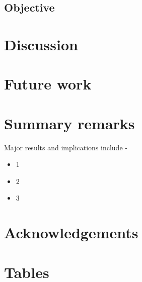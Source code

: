 \documentclass[11pt,a4paper]{article}
\makeatletter
\renewcommand\listoftables{%
    \@starttoc{lot}%
}
\makeatother
\begin{document}
\subsection{Objective} \label{sec-obj}


\newpage


\section{Discussion} \label{sec-disc}


\newpage


\section{Future work} \label{sec-fwk}


\newpage


\section{Summary remarks} \label{sec-sum}

Major results and implications include - 
\begin{itemize}[topsep=0pt,itemsep=-0.75ex,partopsep=1ex,parsep=1ex,leftmargin=*]
    \item 1
    \item 2
    \item 3
\end{itemize}


\newpage


\pagestyle{fancy}
\fancyhf{} %
\renewcommand{\headrulewidth}{0pt} %
\rfoot{\thepage}
\nolinenumbers


\section*{Acknowledgements}


\newpage



\setlength{\bibhang}{0pt}



\newpage


\section*{Tables}
{%
\let\oldnumberline\numberline%
\renewcommand{\numberline}{\tablename~\oldnumberline}%
\listoftables%
}
\end{document}
